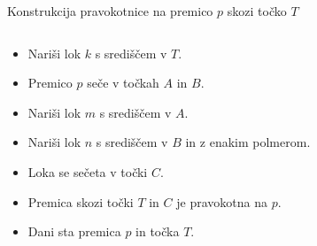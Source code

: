 \begin{frame}{Konstrukcija pravokotnice na premico $p$ skozi točko $T$}

	\begin{columns}
	   \begin{column}{0.55\textwidth}
		   \begin{itemize}
			   \item<1->Nariši lok $k$ s središčem v $T$.
			   \item<2->Premico $p$ seče v točkah $A$ in $B$.
			   \item<3->Nariši lok $m$ s središčem v $A$.
			   \item<4->Nariši lok $n$ s središčem v $B$ in z enakim polmerom.
			   \item<5->Loka se sečeta v točki $C$.
			   \item<6->Premica skozi točki $T$ in $C$ je pravokotna na $p$.
			   \item<7->Dani sta premica $p$ in točka $T$.
		   \end{itemize}
	   \end{column}

	   \begin{column}{0.45\textwidth}
		   \centering
\end{column}
\end{columns}
\end{frame}

